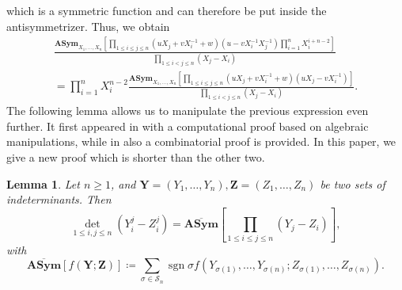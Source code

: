\documentclass[12pt]{amsart}
\newtheorem{lemma}[theorem]{Lemma}
\theoremstyle{definition}
\numberwithin{equation}{section}
\DeclareMathOperator{\sgn}{sgn}
\newcommand{\asym}{\mathbf{ASym}}
\begin{document}
which is a symmetric function and can therefore be put inside the antisymmetrizer. Thus, we obtain
\begin{multline}\label{eq:genfun_AMT1} 
\frac{\asym_{X_1,\ldots,X_n} \left[ \prod_{1 \le i \le j \le n} \left( u  X_j + v  X_i^{-1}  + w  \right) 
\left(u -  v X_i^{-1} X_j^{-1}  \right) 
\prod_{i=1}^{n} X_i^{i+n-2} \right] }{\prod_{1 \le i < j \le n} (X_j - X_i)} \\
= \prod_{i=1}^{n} X_i^{n-2} \frac{\asym_{X_1,\ldots,X_n} \left[ \prod_{1 \le i \le j \le n} \left( u  X_j + v  X_i^{-1}  + w  \right) 
\left(u X_j -  v X_i^{-1}  \right)  \right] }{\prod_{1 \le i < j \le n} (X_j - X_i)}.
\end{multline}
The following lemma allows us to manipulate the previous expression even further. It first appeared in \cite[Lemma~3.1]{TSPPmany} with a computational proof based on algebraic manipulations, while in 
\cite[Lemma 4.1]{TSPP} also a combinatorial proof is provided. In this paper, we give a new proof which is shorter than the other two.

\begin{lemma}
	\label{general}
	Let $n \ge 1$, and $\mathbf{Y}=(Y_1,\ldots,Y_n), \mathbf{Z}=(Z_1,\ldots,Z_n)$ be two sets of indeterminants.
	Then
	\begin{equation}\label{eq:antisymlemma}
		\det_{1 \le i, j \le n} \left( Y_i^j - Z_i^j \right) 
		= \overline{\asym}  \left[  \prod_{1 \le i \le j \le n} (Y_j-Z_i)     \right],
	\end{equation}
	with 
	\begin{equation*}
	\overline{\asym} \left[f(\mathbf{Y};\mathbf{Z})\right] \coloneq \sum_{\sigma \in {\mathcal{S}_n}} \sgn \sigma f(Y_{\sigma(1)},\ldots,Y_{\sigma(n)};Z_{\sigma(1)},\ldots,Z_{\sigma(n)}).
	\end{equation*}
\end{lemma}
\end{document}
